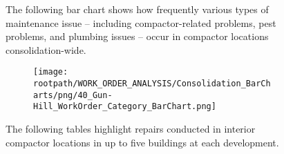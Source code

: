 \begin{figure}[h]
                                \sf
                                The following bar chart shows how frequently various types of maintenance issue -- including compactor-related problems, pest problems, and plumbing issues -- occur in compactor locations consolidation-wide.
                                \raggedright
                                \begin{subfigure}{\textwidth}
                                \texttt{[image: \\rootpath/WORK\_ORDER\_ANALYSIS/Consolidation\_BarCharts/png/40\_Gun-Hill\_WorkOrder\_Category\_BarChart.png]}
                                \end{subfigure}
                                \end{figure}
\begin{figure}[h]
                                \raggedright
                                \sf
                                The following tables highlight repairs conducted in interior compactor locations in up to five buildings at each development.\\
                                
\end{figure}
